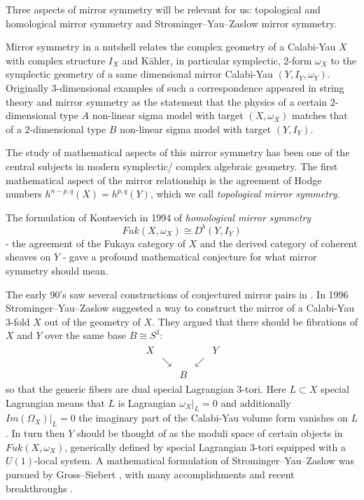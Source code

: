 \documentclass[12pt]{article}
\numberwithin{equation}{section}
\theoremstyle{remark}
\numberwithin{theorem}{section}
\def\beq{\begin{eqnarray}}
\def\eeq{\end{eqnarray}}
\numberwithin{equation}{section}
\begin{document}
Three aspects of mirror symmetry will be relevant for us: topological and homological mirror symmetry and  Strominger--Yau--Zaslow mirror symmetry.

Mirror symmetry in a nutshell relates the complex geometry of a Calabi-Yau $X$ with complex structure $I_X$ and K\"ahler, in particular symplectic,  $2$-form $\omega_X$ to the symplectic geometry of a same dimensional mirror Calabi-Yau $(Y,I_Y,\omega_Y)$. Originally \cite{greene-plesser} $3$-dimensional examples of such a correspondence appeared in string theory and mirror symmetry  as the statement that the physics of a  certain $2$-dimensional  type $A$ non-linear sigma model with target $(X,\omega_X)$ matches that of a $2$-dimensional type $B$ non-linear sigma model with target $(Y,I_Y)$. 

The study of mathematical aspects of this mirror symmetry has been one of the central subjects in modern symplectic/ complex algebraic geometry. The first mathematical aspect of the mirror relationship is the agreement of Hodge numbers $h^{n-p,q}(X)=h^{p,q}(Y)$, which we call {\em topological mirror symmetry}. 

The formulation of Kontsevich \cite{kontsevich} in 1994 of {\em homological mirror symmetry}  $$Fuk(X,\omega_X)\cong D^b(Y,I_Y)$$  - the agreement of the Fukaya category of $X$ and the derived category of coherent sheaves on $Y$ - gave a profound mathematical conjecture for what mirror symmetry should mean. 

The early 90's saw several  constructions of conjectured mirror pairs in \cite{candelas-etal1,batyrev1,batyrev-borisov}. In 1996 \cite{strominger-etal} Strominger--Yau--Zaslow  suggested a way  to construct the mirror of a Calabi-Yau $3$-fold $X$ out of the geometry of $X$. They argued that there should be fibrations of $X$ and $Y$ over the same base $B\cong S^3$: \beq \label{syz}\begin{array}{ccccc} X&&&&Y \\ &\searrow&&\swarrow& \\ &&B&& \end{array}\eeq so that the generic fibers are dual special Lagrangian $3$-tori. Here $L\subset X$  special Lagrangian  means that $L$ is Lagrangian $\omega_X|_L=0$ and additionally $Im(\Omega_X)|_L=0$ the imaginary part of the Calabi-Yau volume form vanishes on $L$. In turn then $Y$ should be thought of as the moduli space of certain objects in $Fuk(X,\omega_X)$, generically defined by special Lagrangian $3$-tori  equipped with a $U(1)$-local system.  A mathematical formulation of Strominger--Yau--Zaslow was pursued by Gross--Siebert \cite{gross-siebert1}, with many accomplishments and recent breakthroughs \cite{gross-siebert2,gross-etal}. 
\end{document}
